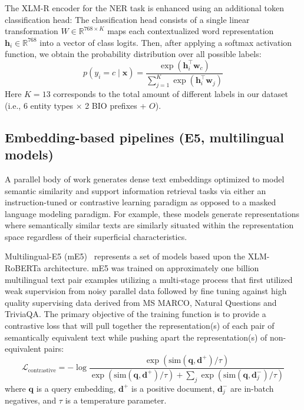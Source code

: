 The XLM-R encoder for the NER task is enhanced using an additional token classification head:
The classification head consists of a single linear transformation $W \in \mathbb{R}^{768 \times K}$ maps each contextualized word representation $\mathbf{h}_i \in \mathbb{R}^{768}$ into a vector of class logits. Then, after applying a softmax activation function, we obtain the probability distribution over all possible labels:
\begin{equation}
  p(y_i = c \mid \mathbf{x}) = \frac{\exp(\mathbf{h}_i^\top \mathbf{w}_c)}{\sum_{j=1}^{K} \exp(\mathbf{h}_i^\top \mathbf{w}_j)}
  \label{eq:softmax_ch1}
\end{equation}
Here $K = 13$ corresponds to the total amount of different labels in our dataset (i.e., 6 entity types $\times$ 2 BIO prefixes + $O$).

\subsection{Embedding-based pipelines (E5, multilingual models)}
\label{sec:embeddings}

A parallel body of work generates dense text embeddings optimized to model semantic similarity and support information retrieval tasks via either an instruction-tuned or contrastive learning paradigm as opposed to a masked language modeling paradigm. For example, these models generate representations where semantically similar texts are similarly situated within the representation space regardless of their superficial characteristics. 

Multilingual-E5 (mE5)~\cite{wang2023e5} represents a set of models based upon the XLM-RoBERTa architecture. mE5 was trained on approximately one billion multilingual text pair examples utilizing a multi-stage process that first utilized weak supervision from noisy parallel data followed by fine tuning against high quality supervising data derived from MS MARCO, Natural Questions and TriviaQA. The primary objective of the training function is to provide a contrastive loss that will pull together the representation(s) of each pair of semantically equivalent text while pushing apart the representation(s) of non-equivalent pairs:
\begin{equation}
  \mathcal{L}_\text{contrastive} = -\log \frac{\exp(\text{sim}(\mathbf{q}, \mathbf{d}^+) / \tau)}{\exp(\text{sim}(\mathbf{q}, \mathbf{d}^+) / \tau) + \sum_{j} \exp(\text{sim}(\mathbf{q}, \mathbf{d}^-_j) / \tau)}
\end{equation}
where $\mathbf{q}$ is a query embedding, $\mathbf{d}^+$ is a positive document, $\mathbf{d}^-_j$ are in-batch negatives, and $\tau$ is a temperature parameter.

